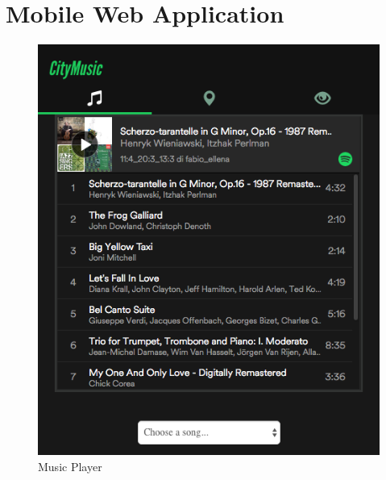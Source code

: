 \documentclass[paper=a4, fontsize=11pt]{scrartcl}
\begin{document}
\section{Mobile Web Application}
\begin{figure}[!htb]  
\begin{minipage}[t]{0.45\textwidth}
\includegraphics[width=\linewidth]{images/Player.png}
\caption{Music Player}
\label{fig:music_player}
\end{minipage}
\hspace{\fill}
\begin{minipage}[t]{0.45\textwidth}

\end{minipage}
\end{figure}
\end{document}
